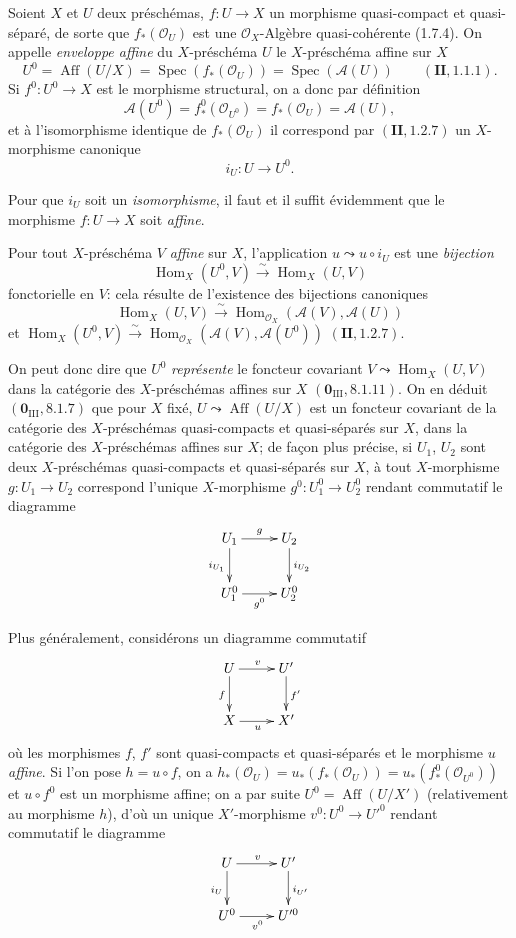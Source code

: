 \begin{env}[21.12.1]
Soient $X$ et $U$ deux préschémas, $f:U\to X$ un morphisme quasi-compact et
quasi-séparé, de sorte que $f_*(\mathcal O_U)$ est une $\mathcal O_X$-Algèbre
quasi-cohérente (1.7.4). On appelle \emph{enveloppe affine} du $X$-préschéma $U$ le
$X$-préschéma affine sur $X$
\[
  U^0=\operatorname{Aff}(U/X)=\operatorname{Spec}(f_*(\mathcal O_U))
  =\operatorname{Spec}(\mathscr A(U))\qquad(\mathbf{II}, 1.1.1).
\]
Si $f^0:U^0\to X$ est le morphisme structural, on a donc par définition
\[
  \mathscr A(U^0)=f^0_*(\mathcal O_{U^0})=f_*(\mathcal O_U)=\mathscr A(U),
\]
et à l'isomorphisme identique de $f_*(\mathcal O_U)$ il correspond par
$(\mathbf{II}, 1.2.7)$ un $X$-morphisme canonique
\[
\label{IV.21.12.1.1}
  i_U:U\to U^0.
  \tag{21.12.1.1}
\]

Pour que $i_U$ soit un \emph{isomorphisme}, il faut et il suffit évidemment que le
morphisme $f:U\to X$ soit \emph{affine}.

Pour tout $X$-préschéma $V$ \emph{affine} sur
$X$, l'application $u\leadsto u\circ i_U$ est une \emph{bijection}
\[
  \operatorname{Hom}_X(U^0,V)\xrightarrow{\sim}\operatorname{Hom}_X(U,V)
\]
fonctorielle en $V$: cela résulte de l'existence des bijections canoniques
\[
  \operatorname{Hom}_X(U,V)\xrightarrow{\sim}
  \operatorname{Hom}_{\mathcal O_X}(\mathscr A(V),\mathscr A(U))
\]
et
$\operatorname{Hom}_X(U^0,V)\xrightarrow{\sim}
\operatorname{Hom}_{\mathcal O_X}(\mathscr A(V),\mathscr A(U^0))$
$(\mathbf{II}, 1.2.7)$.

On peut donc dire que $U^0$ \emph{représente} le foncteur covariant
$V\leadsto\operatorname{Hom}_X(U,V)$ dans la catégorie des $X$-préschémas affines sur
$X$ $(\mathbf 0_{\mathrm{III}}, 8.1.11)$. On en déduit
$(\mathbf 0_{\mathrm{III}}, 8.1.7)$ que pour $X$ fixé,
$U\leadsto\operatorname{Aff}(U/X)$ est un foncteur covariant de la catégorie des
$X$-préschémas quasi-compacts et quasi-séparés sur $X$, dans la catégorie des
$X$-préschémas affines sur $X$; de façon plus précise, si $U_1$, $U_2$ sont deux
$X$-préschémas quasi-compacts et quasi-séparés sur $X$, à tout $X$-morphisme
$g:U_1\to U_2$ correspond l'unique $X$-morphisme $g^0:U_1^0\to U_2^0$ rendant
commutatif le diagramme
\[
  \xymatrix{
    U_1 \ar[r]^g \ar[d]_{i_{U_1}} & U_2 \ar[d]^{i_{U_2}} \\
    U_1^0 \ar[r]_{g^0} & U_2^0
  }
\]
\end{env}

Plus généralement, considérons un diagramme commutatif
\[
  \xymatrix{
    U \ar[r]^v \ar[d]_f & U' \ar[d]^{f'} \\
    X \ar[r]_u & X'
  }
\]
où les morphismes $f$, $f'$ sont quasi-compacts et quasi-séparés et le morphisme $u$
\emph{affine}. Si l'on pose $h=u\circ f$, on a
$h_*(\mathcal O_U)=u_*(f_*(\mathcal O_U))=u_*(f^0_*(\mathcal O_{U^0}))$ et
$u\circ f^0$ est un morphisme affine; on a par suite
$U^0=\operatorname{Aff}(U/X')$ (relativement au morphisme $h$), d'où un unique
$X'$-morphisme $v^0:U^0\to U'^0$ rendant commutatif le diagramme
\[
  \xymatrix{
    U \ar[r]^v \ar[d]_{i_U} & U' \ar[d]^{i_{U'}} \\
    U^0 \ar[r]_{v^0} & U'^0
  }
\]


